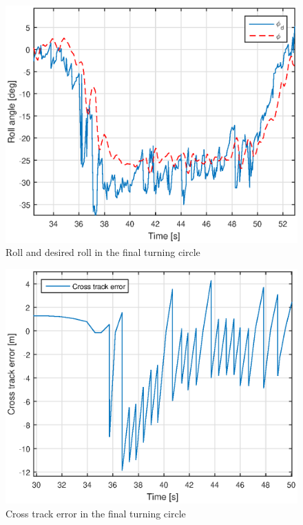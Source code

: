 \begin{figure}
\centering
\includegraphics[scale=0.7]{figs/Experiment/Roll1juni083423.eps}
\caption{Roll and desired roll in the final turning circle}
\label{Fig:RollFinalTurning083423}
\end{figure}
\begin{figure}[H]
\centering
\includegraphics[scale=0.7]{figs/Experiment/CrossTrackError1juni083423.eps}
\caption{Cross track error in the final turning circle}
\label{Fig:CrossTrackError1juni083423}
\end{figure}
